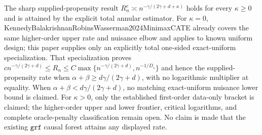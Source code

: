 \documentclass{article}
\begin{document}
The sharp supplied-propensity result \(R_n^e\asymp n^{-\gamma/(2\gamma+d+\kappa)}\) holds for every \(\kappa\geq0\) and is attained by the explicit total annular estimator.  For \(\kappa=0\), KennedyBalakrishnanRobinsWasserman2024MinimaxCATE already covers the same higher-order upper rate and nuisance elbow and applies to known uniform design; this paper supplies only an explicitly total one-sided exact-uniform specialization.  That specialization proves \(c n^{-\gamma/(2\gamma+d)}\leq R_n\leq C\max\{n^{-\gamma/(2\gamma+d)},n^{-1/D_\star}\}\) and hence the supplied-propensity rate when \(\alpha+\beta\geq d\gamma/(2\gamma+d)\), with no logarithmic multiplier at equality.  When \(\alpha+\beta<d\gamma/(2\gamma+d)\), no matching exact-uniform nuisance lower bound is claimed.  For \(\kappa>0\), only the established first-order data-only bracket is claimed; the higher-order upper and lower frontier, critical logarithms, and complete oracle-penalty classification remain open.  No claim is made that the existing \(\texttt{grf}\) causal forest attains any displayed rate.
\end{document}
